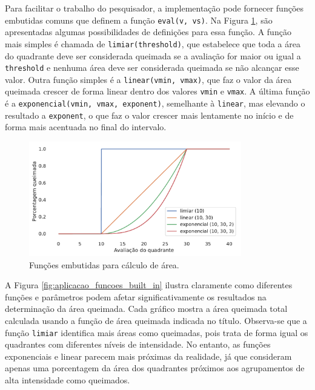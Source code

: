 \documentclass[cic,tc]{iiufrgs}
\begin{document}
Para facilitar o trabalho do pesquisador, a implementação pode fornecer funções embutidas comuns que definem a função \texttt{eval(v, vs)}. Na Figura \ref{fig:eval_func_built_in}, são apresentadas algumas possibilidades de definições para essa função. A função mais simples é chamada de \texttt{limiar(threshold)}, que estabelece que toda a área do quadrante deve ser considerada queimada se a avaliação for maior ou igual a \texttt{threshold} e nenhuma área deve ser considerada queimada se não alcançar esse valor. Outra função simples é a \texttt{linear(vmin, vmax)}, que faz o valor da área queimada crescer de forma linear dentro dos valores \texttt{vmin} e \texttt{vmax}. A última função é a \texttt{exponencial(vmin, vmax, exponent)}, semelhante à \texttt{linear}, mas elevando o resultado a \texttt{exponent}, o que faz o valor crescer mais lentamente no início e de forma mais acentuada no final do intervalo.

\begin{figure}[!htb]
    \caption{Funções embutidas para cálculo de área.}
    \begin{center}
        \includegraphics[width=25em]{eval_func_built_in}
    \end{center}
    \label{fig:eval_func_built_in}
\end{figure}

A Figura \ref{fig:aplicacao_funcoes_built_in} ilustra claramente como diferentes funções e parâmetros podem afetar significativamente os resultados na determinação da área queimada. Cada gráfico mostra a área queimada total calculada usando a função de área queimada indicada no título. Observa-se que a função \texttt{limiar} identifica mais áreas como queimadas, pois trata de forma igual os quadrantes com diferentes níveis de intensidade. No entanto, as funções exponenciais e linear parecem mais próximas da realidade, já que consideram apenas uma porcentagem da área dos quadrantes próximos aos agrupamentos de alta intensidade como queimados.
\end{document}
